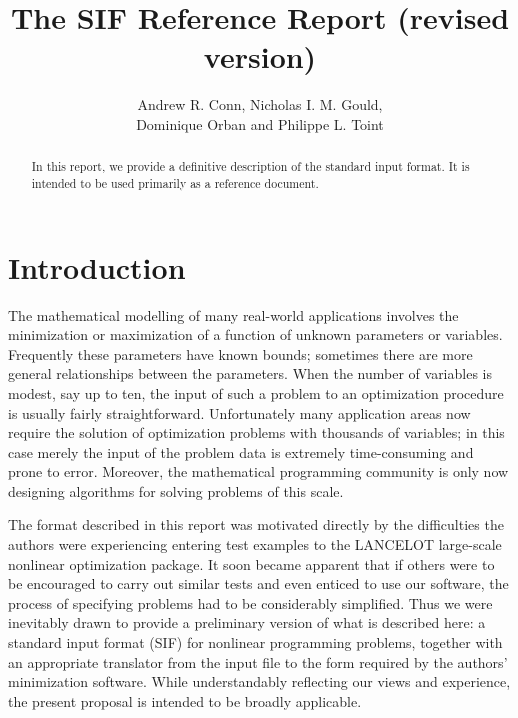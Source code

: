 \documentclass[a4paper]{article}
\title{The SIF Reference Report (revised version)}
\author{Andrew R. Conn, Nicholas I. M. Gould, \\ Dominique Orban
and Philippe L. Toint}
\begin{document}


\maketitle

\begin{abstract}
In this report, we provide a definitive description of the standard
input format.
It is intended to be used primarily as a reference document.
\end{abstract}


{\small
\tableofcontents
}

\section{\label{S1.1}Introduction}
\setcounter{figure}{0}

The mathematical   modelling of many real-world  applications involves
the  minimization or maximization of  a function of unknown parameters
or   variables.   Frequently   these  parameters   have known  bounds;
sometimes there are more general relationships between the parameters.
When the number of variables is  modest,  say up  to ten, the input of
such  a   problem to  an  optimization procedure  is    usually fairly
straightforward. Unfortunately many application areas  now require the
solution of optimization problems with thousands of variables; in this
case merely the input of the problem data  is extremely time-consuming
and prone to error. Moreover,  the mathematical programming  community
is only now designing algorithms for solving problems of this scale.

The format described in this report
was motivated directly by the  difficulties the authors were
experiencing entering test examples to the {\sf  LANCELOT} large-scale
nonlinear optimization  package.  It soon    became apparent  that  if
others  were to  be  encouraged to carry  out similar  tests  and even
enticed to use our software, the process of specifying problems had to
be considerably simplified. Thus we were inevitably drawn to provide a
preliminary   version of what   is described here:
a standard input format  (SIF) for nonlinear programming
problems, together with an appropriate translator from the  input file
to  the form required  by the  authors'  minimization software.  While
understandably reflecting   our views  and   experience, the   present
proposal is intended to be broadly applicable.
\end{document}
